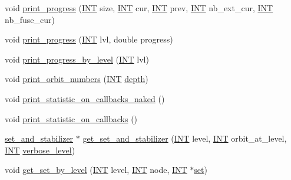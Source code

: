 \begin{DoxyCompactItemize}
\item 
void \mbox{\hyperlink{classgenerator_ab1bc556218cd131c802ed1e137ccc4ae}{print\+\_\+progress}} (\mbox{\hyperlink{galois_8h_a09fddde158a3a20bd2dcadb609de11dc}{I\+NT}} size, \mbox{\hyperlink{galois_8h_a09fddde158a3a20bd2dcadb609de11dc}{I\+NT}} cur, \mbox{\hyperlink{galois_8h_a09fddde158a3a20bd2dcadb609de11dc}{I\+NT}} prev, \mbox{\hyperlink{galois_8h_a09fddde158a3a20bd2dcadb609de11dc}{I\+NT}} nb\+\_\+ext\+\_\+cur, \mbox{\hyperlink{galois_8h_a09fddde158a3a20bd2dcadb609de11dc}{I\+NT}} nb\+\_\+fuse\+\_\+cur)
\item 
void \mbox{\hyperlink{classgenerator_a3948b1b2e2b9e395bb940b3d804edcbd}{print\+\_\+progress}} (\mbox{\hyperlink{galois_8h_a09fddde158a3a20bd2dcadb609de11dc}{I\+NT}} lvl, double progress)
\item 
void \mbox{\hyperlink{classgenerator_a7440be7583571676c0cce394aae53fef}{print\+\_\+progress\+\_\+by\+\_\+level}} (\mbox{\hyperlink{galois_8h_a09fddde158a3a20bd2dcadb609de11dc}{I\+NT}} lvl)
\item 
void \mbox{\hyperlink{classgenerator_a9da74456f2e9b3dffb36ca05815bb3da}{print\+\_\+orbit\+\_\+numbers}} (\mbox{\hyperlink{galois_8h_a09fddde158a3a20bd2dcadb609de11dc}{I\+NT}} \mbox{\hyperlink{classgenerator_a2560425547ee25a53b8a184aecc0d23e}{depth}})
\item 
void \mbox{\hyperlink{classgenerator_ad9bea0506f53f0e30074eb6917b8178d}{print\+\_\+statistic\+\_\+on\+\_\+callbacks\+\_\+naked}} ()
\item 
void \mbox{\hyperlink{classgenerator_aaed300cc45b7045e96ff4a95265c9a61}{print\+\_\+statistic\+\_\+on\+\_\+callbacks}} ()
\item 
\mbox{\hyperlink{classset__and__stabilizer}{set\+\_\+and\+\_\+stabilizer}} $\ast$ \mbox{\hyperlink{classgenerator_a23116270f27facfd48e4190a84e0ef20}{get\+\_\+set\+\_\+and\+\_\+stabilizer}} (\mbox{\hyperlink{galois_8h_a09fddde158a3a20bd2dcadb609de11dc}{I\+NT}} level, \mbox{\hyperlink{galois_8h_a09fddde158a3a20bd2dcadb609de11dc}{I\+NT}} orbit\+\_\+at\+\_\+level, \mbox{\hyperlink{galois_8h_a09fddde158a3a20bd2dcadb609de11dc}{I\+NT}} \mbox{\hyperlink{classgenerator_a7fedc6488314cbc00dbfcc42d311e1ce}{verbose\+\_\+level}})
\item 
void \mbox{\hyperlink{classgenerator_a3012a80d862b42c848b84584389c8594}{get\+\_\+set\+\_\+by\+\_\+level}} (\mbox{\hyperlink{galois_8h_a09fddde158a3a20bd2dcadb609de11dc}{I\+NT}} level, \mbox{\hyperlink{galois_8h_a09fddde158a3a20bd2dcadb609de11dc}{I\+NT}} node, \mbox{\hyperlink{galois_8h_a09fddde158a3a20bd2dcadb609de11dc}{I\+NT}} $\ast$\mbox{\hyperlink{nauty_8h_a9690bea211101f22a5e154087590c3da}{set}})

\end{DoxyCompactItemize}
